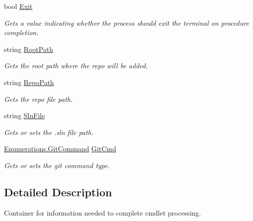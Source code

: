 \begin{DoxyCompactItemize}
bool \mbox{\hyperlink{class_get_repo_cmdlet_1_1_cmd_container_a82345df98877ab881d8363d2bae6b51c}{Exit}}
\begin{DoxyCompactList}\small\item\em Gets a value indicating whether the process should exit the terminal on procedure completion. \end{DoxyCompactList}\item 
string \mbox{\hyperlink{class_get_repo_cmdlet_1_1_cmd_container_a65f2a49c7e4f8f1848577840e705bd9f}{Root\+Path}}
\begin{DoxyCompactList}\small\item\em Gets the root path where the repo will be added. \end{DoxyCompactList}\item 
string \mbox{\hyperlink{class_get_repo_cmdlet_1_1_cmd_container_a634b5f69f676258f3735f6b095b8c5c7}{Repo\+Path}}
\begin{DoxyCompactList}\small\item\em Gets the repo file path. \end{DoxyCompactList}\item 
string \mbox{\hyperlink{class_get_repo_cmdlet_1_1_cmd_container_a059a91e8df682e275e0b2e46ac6b28a3}{Sln\+File}}
\begin{DoxyCompactList}\small\item\em Gets or sets the .sln file path. \end{DoxyCompactList}\item 
\mbox{\hyperlink{class_get_repo_cmdlet_1_1_enumerations_a52683b5a6aca649a73b7bc9a076cc747}{Enumerations.\+Git\+Command}} \mbox{\hyperlink{class_get_repo_cmdlet_1_1_cmd_container_a7f722b89dac0b65bfb0f897350ee68c3}{Git\+Cmd}}
\begin{DoxyCompactList}\small\item\em Gets or sets the git command type. \end{DoxyCompactList}\end{DoxyCompactItemize}


\subsection{Detailed Description}
Container for information needed to complete cmdlet processing. 



